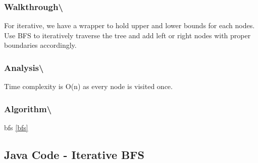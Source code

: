 \documentclass[]{book}
\begin{document}
\hypertarget{walkthrough-79}{%
\subsubsection{Walkthrough\textbackslash{}}\label{walkthrough-79}}

For iterative, we have a wrapper to hold upper and lower bounds for each nodes. Use BFS to iteratively traverse the tree and
add left or right nodes with proper boundaries accordingly.

\hypertarget{analysis-86}{%
\subsubsection{Analysis\textbackslash{}}\label{analysis-86}}

Time complexity is O(n) as every node is visited once.

\hypertarget{algorithm-87}{%
\subsubsection{Algorithm\textbackslash{}}\label{algorithm-87}}

bfs \ref{bfs}

\hypertarget{java-code---iterative-bfs-1}{%
\subsection{Java Code - Iterative BFS}\label{java-code---iterative-bfs-1}}
\end{document}
